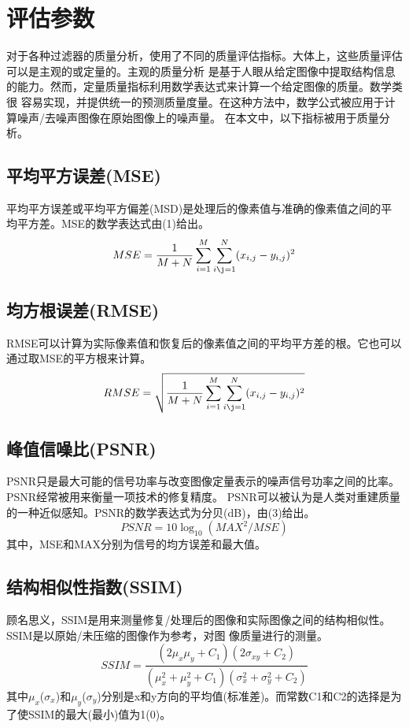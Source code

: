 \documentclass[12pt]{article} %
\begin{document}
\section{评估参数}
对于各种过滤器的质量分析，使用了不同的质量评估指标。大体上，这些质量评估可以是主观的或定量的。主观的质量分析
是基于人眼从给定图像中提取结构信息的能力。然而，定量质量指标利用数学表达式来计算一个给定图像的质量。数学类很
容易实现，并提供统一的预测质量度量。在这种方法中，数学公式被应用于计算噪声/去噪声图像在原始图像上的噪声量。
在本文中，以下指标被用于质量分析。

\subsection{平均平方误差(MSE)}
平均平方误差或平均平方偏差(MSD)是处理后的像素值与准确的像素值之间的平均平方差。MSE的数学表达式由(1)给出。
\begin{equation}
    MSE= \frac{1}{M+N}\sum_{i=1}^M\sum_{i\j=1}^N(x_{i,j}-y_{i,j})^2
\end{equation}

\subsection{均方根误差(RMSE)}
RMSE可以计算为实际像素值和恢复后的像素值之间的平均平方差的根。它也可以通过取MSE的平方根来计算。
\begin{equation}
    RMSE=\sqrt{\frac{1}{M+N}\sum_{i=1}^M\sum_{i\j=1}^N(x_{i,j}-y_{i,j})^2}
\end{equation}

\subsection{峰值信噪比(PSNR)}
PSNR只是最大可能的信号功率与改变图像定量表示的噪声信号功率之间的比率。PSNR经常被用来衡量一项技术的修复精度。
PSNR可以被认为是人类对重建质量的一种近似感知。PSNR的数学表达式为分贝(dB)，由(3)给出。
\begin{equation}
    PSNR=10\log_{10}({MAX^2}/{MSE})
\end{equation}
其中，MSE和MAX分别为信号的均方误差和最大值。

\subsection{结构相似性指数(SSIM)}
顾名思义，SSIM是用来测量修复/处理后的图像和实际图像之间的结构相似性。SSIM是以原始/未压缩的图像作为参考，对图
像质量进行的测量。
\begin{equation}
    SSIM=\frac{(2\mu_x\mu_y+C_1)(2\sigma_{xy}+C_2)}{(\mu_x^2+\mu_y^2+C_1)(\sigma_x^2+\sigma_y^2+C_2)}
\end{equation}
其中$\mu_x$($\sigma_x$)和$\mu_y$($\sigma_y$)分别是x和y方向的平均值(标准差)。而常数C1和C2的选择是为了使SSIM的最大(最小)值为1(0)。
\end{document}

